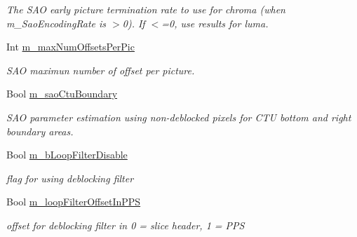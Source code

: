 \begin{DoxyCompactItemize}
\begin{DoxyCompactList}\small\item\em The S\+AO early picture termination rate to use for chroma (when m\+\_\+\+Sao\+Encoding\+Rate is $>$0). If $<$=0, use results for luma. \end{DoxyCompactList}\item 
\mbox{\label{class_t_app_enc_cfg_a509788206ea72eac192325db90253cd4}} 
Int \hyperlink{class_t_app_enc_cfg_a509788206ea72eac192325db90253cd4}{m\+\_\+max\+Num\+Offsets\+Per\+Pic}
\begin{DoxyCompactList}\small\item\em S\+AO maximun number of offset per picture. \end{DoxyCompactList}\item 
\mbox{\label{class_t_app_enc_cfg_abcdc30d3daa54aeb93b203f5ee02a07f}} 
Bool \hyperlink{class_t_app_enc_cfg_abcdc30d3daa54aeb93b203f5ee02a07f}{m\+\_\+sao\+Ctu\+Boundary}
\begin{DoxyCompactList}\small\item\em S\+AO parameter estimation using non-\/deblocked pixels for C\+TU bottom and right boundary areas. \end{DoxyCompactList}\item 
\mbox{\label{class_t_app_enc_cfg_a14b468a20d302bcf48e96a517e71fffc}} 
Bool \hyperlink{class_t_app_enc_cfg_a14b468a20d302bcf48e96a517e71fffc}{m\+\_\+b\+Loop\+Filter\+Disable}
\begin{DoxyCompactList}\small\item\em flag for using deblocking filter \end{DoxyCompactList}\item 
\mbox{\label{class_t_app_enc_cfg_ac603aed5023e8fb8a1b9bb424235bd72}} 
Bool \hyperlink{class_t_app_enc_cfg_ac603aed5023e8fb8a1b9bb424235bd72}{m\+\_\+loop\+Filter\+Offset\+In\+P\+PS}
\begin{DoxyCompactList}\small\item\em offset for deblocking filter in 0 = slice header, 1 = P\+PS \end{DoxyCompactList}\item 
\mbox{\label{class_t_app_enc_cfg_a31770cd959cc7457169989ad373fdd90}} 

\end{DoxyCompactItemize}
